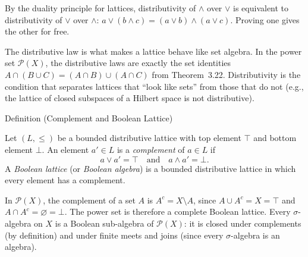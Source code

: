 \begin{remark*}
\label{rem:dist-dual}
By the duality principle for lattices, distributivity of $\wedge$ over $\vee$
is equivalent to distributivity of $\vee$ over $\wedge$:
$a \vee (b \wedge c) = (a \vee b) \wedge (a \vee c)$.
Proving one gives the other for free.
\end{remark*}

\begin{remark*}
\label{rem:dist-matters}
The distributive law is what makes a lattice behave like set algebra.  In the
power set $\mathcal{P}(X)$, the distributive laws are exactly the set
identities $A \cap (B \cup C) = (A \cap B) \cup (A \cap C)$ from
Theorem~3.22.  Distributivity is the condition that separates lattices that
``look like sets'' from those that do not (e.g., the lattice of closed
subspaces of a Hilbert space is not distributive).
\end{remark*}

\begin{definitionbox}{Definition (Complement and Boolean Lattice)}
\begin{definition}\label{def:boolean-lattice}
Let $(L, \leq)$ be a bounded distributive lattice with top element $\top$ and
bottom element $\bot$.  An element $a' \in L$ is a \emph{complement} of
$a \in L$ if
\[
  a \vee a' = \top \quad \text{and} \quad a \wedge a' = \bot.
\]
A \emph{Boolean lattice} (or \emph{Boolean algebra}) is a bounded distributive
lattice in which every element has a complement.
\end{definition}
\end{definitionbox}

\begin{remark*}
\label{rem:power-set-boolean}
In $\mathcal{P}(X)$, the complement of a set $A$ is $A^c = X \setminus A$,
since $A \cup A^c = X = \top$ and $A \cap A^c = \varnothing = \bot$.  The
power set is therefore a complete Boolean lattice.  Every $\sigma$-algebra
on $X$ is a Boolean sub-algebra of $\mathcal{P}(X)$: it is closed under
complements (by definition) and under finite meets and joins (since every
$\sigma$-algebra is an algebra).
\end{remark*}


